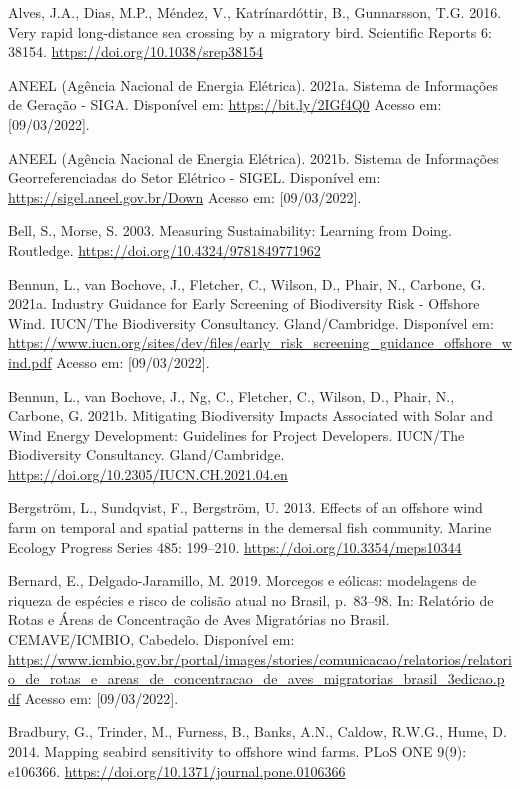 \documentclass[
  oneside]{scrbook}
\begin{document}
Alves, J.A., Dias, M.P., Méndez, V., Katrínardóttir, B., Gunnarsson, T.G. 2016. Very rapid long-distance sea crossing by a migratory bird. Scientific Reports 6: 38154. \url{https://doi.org/10.1038/srep38154}

ANEEL (Agência Nacional de Energia Elétrica). 2021a. Sistema de Informações de Geração - SIGA. Disponível em: \url{https://bit.ly/2IGf4Q0} Acesso em: {[}09/03/2022{]}.

ANEEL (Agência Nacional de Energia Elétrica). 2021b. Sistema de Informações Georreferenciadas do Setor Elétrico - SIGEL. Disponível em: \url{https://sigel.aneel.gov.br/Down} Acesso em: {[}09/03/2022{]}.

Bell, S., Morse, S. 2003. Measuring Sustainability: Learning from Doing. Routledge. \url{https://doi.org/10.4324/9781849771962}

Bennun, L., van Bochove, J., Fletcher, C., Wilson, D., Phair, N., Carbone, G. 2021a. Industry Guidance for Early Screening of Biodiversity Risk - Offshore Wind. IUCN/The Biodiversity Consultancy. Gland/Cambridge. Disponível em: \url{https://www.iucn.org/sites/dev/files/early_risk_screening_guidance_offshore_wind.pdf} Acesso em: {[}09/03/2022{]}.

Bennun, L., van Bochove, J., Ng, C., Fletcher, C., Wilson, D., Phair, N., Carbone, G. 2021b. Mitigating Biodiversity Impacts Associated with Solar and Wind Energy Development: Guidelines for Project Developers. IUCN/The Biodiversity Consultancy. Gland/Cambridge. \url{https://doi.org/10.2305/IUCN.CH.2021.04.en}

Bergström, L., Sundqvist, F., Bergström, U. 2013. Effects of an offshore wind farm on temporal and spatial patterns in the demersal fish community. Marine Ecology Progress Series 485: 199--210. \url{https://doi.org/10.3354/meps10344}

Bernard, E., Delgado-Jaramillo, M. 2019. Morcegos e eólicas: modelagens de riqueza de espécies e risco de colisão atual no Brasil, p.~83--98. In: Relatório de Rotas e Áreas de Concentração de Aves Migratórias no Brasil. CEMAVE/ICMBIO, Cabedelo. Disponível em: \url{https://www.icmbio.gov.br/portal/images/stories/comunicacao/relatorios/relatorio_de_rotas_e_areas_de_concentracao_de_aves_migratorias_brasil_3edicao.pdf} Acesso em: {[}09/03/2022{]}.

Bradbury, G., Trinder, M., Furness, B., Banks, A.N., Caldow, R.W.G., Hume, D. 2014. Mapping seabird sensitivity to offshore wind farms. PLoS ONE 9(9): e106366. \url{https://doi.org/10.1371/journal.pone.0106366}
\end{document}
